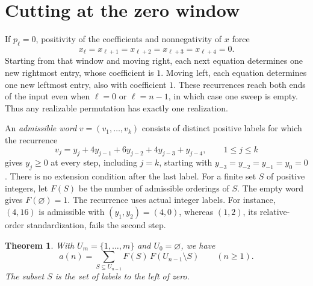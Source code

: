 \documentclass[11pt]{article}
\newtheorem{theorem}{Theorem}[section]
\begin{document}
\section{Cutting at the zero window}

If \(p_\ell=0\), positivity of the coefficients and nonnegativity of \(x\)
force
\[
 x_\ell=x_{\ell+1}=x_{\ell+2}=x_{\ell+3}=x_{\ell+4}=0.
\]
Starting from that window and moving right, each next equation determines
one new rightmost entry, whose coefficient is \(1\). Moving left,
each equation determines one new leftmost entry, also with coefficient
\(1\). These recurrences reach both ends of the input even when
\(\ell=0\) or \(\ell=n-1\), in which case one sweep is empty. Thus any
realizable permutation has exactly one realization.

An \emph{admissible word} \(v=(v_1,\ldots,v_k)\) consists of distinct
positive labels for which the recurrence
\begin{equation}
 v_j=y_j+4y_{j-1}+6y_{j-2}+4y_{j-3}+y_{j-4},
 \qquad 1\leq j\leq k
 \label{eq:side}
\end{equation}
gives \(y_j\geq0\) at every step, including \(j=k\), starting with
\(y_{-3}=y_{-2}=y_{-1}=y_0=0\). There is no extension condition after
the last label. For a finite set \(S\) of positive integers, let \(F(S)\) be the
number of admissible orderings of \(S\). The empty word gives
\(F(\varnothing)=1\). The recurrence uses actual integer labels. For
instance, \((4,16)\) is admissible with \((y_1,y_2)=(4,0)\), whereas
\((1,2)\), its relative-order standardization, fails the second step.

\begin{theorem}\label{thm:split}
With \(U_m=\{1,\ldots,m\}\) and \(U_0=\varnothing\), we have
\begin{equation}
 a(n)=\sum_{S\subseteq U_{n-1}}F(S)\,F(U_{n-1}\setminus S)
 \qquad (n\geq1).
 \label{eq:sum}
\end{equation}
The subset \(S\) is the set of labels to the left of zero.
\end{theorem}
\end{document}
